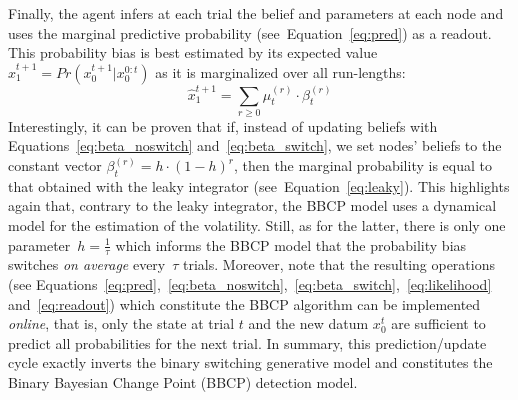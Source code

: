\documentclass[10pt,letterpaper]{article}
\newcommand{\eql}[1]{\begin{equation}#1\end{equation}}
\DeclareMathOperator{\argmax}{argmax}
\newcommand{\seeEq}[1]{Equation~\ref{eq:#1}}
\begin{document}
Finally, the agent infers at each trial the belief and parameters at each node
and uses the marginal predictive probability (see~\seeEq{pred}) as a readout.
This probability bias is best estimated by its expected value $\hat{x}_1^{t+1}=Pr(x_0^{t+1} | x_0^{0:t})$
as it is marginalized over all run-lengths:
\eql{
\hat{x}_1^{t+1} = \sum_{r \geq 0} \mu^{(r)}_{t} \cdot \beta^{(r)}_{t}
\label{eq:readout}
}
Interestingly, it can be proven that if,
instead of updating beliefs with Equations~\ref{eq:beta_noswitch} and~\ref{eq:beta_switch},
we set nodes' beliefs to the constant vector $\beta^{(r)}_t = h \cdot (1 -h) ^r$,
then the marginal probability is equal to that obtained with the leaky integrator (see~\seeEq{leaky}).
This highlights again that, contrary to the leaky integrator, %
the BBCP model uses a dynamical model for the estimation of the volatility.
Still, as for the latter, there is only one parameter~$h=\frac 1 \tau$ which informs the BBCP model
that the probability bias switches \emph{on average} every~$\tau$ trials.
Moreover, note that the resulting operations
(see Equations~\ref{eq:pred},~\ref{eq:beta_noswitch},~\ref{eq:beta_switch},~\ref{eq:likelihood} and~\ref{eq:readout})
which constitute the BBCP algorithm
can be implemented \textit{online}, that is,
only the state at trial $t$ and the new datum $x_0^t$
are sufficient to predict all probabilities for the next trial.
In summary, this prediction/update cycle exactly inverts the binary switching generative model %
and constitutes the Binary Bayesian Change Point (BBCP) detection model.
%
\end{document}
